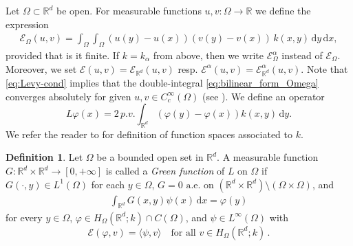 \documentclass[reqno]{amsart}
\theoremstyle{plain}
\theoremstyle{definition}
\newtheorem{definition}[theorem]{Definition}
\numberwithin{equation}{section}
\newcommand{\R}{\mathbb{R}}
\newcommand{\Rd}{\mathbb{R}^d}
\newcommand{\dx} {\, \mathrm{d}x}
\newcommand{\dy} {\, \mathrm{d}y}
\begin{document}
Let $\Omega \subset \Rd$ be open. For measurable functions $u, v: \Omega \to \R$ we define the expression
\begin{align} \label{eq:bilinear_form_Omega}
\mathcal{E}_\Omega (u, v) 
= \int_\Omega \int_\Omega (u(y) - u(x))(v(y) - v(x)) \, k(x,y) \dy \dx,
\end{align}
provided that is it finite. If $k=k_{\alpha}$ from above, then we write $\mathcal{E}_{\Omega}^{\alpha}$ instead of $\mathcal{E}_{\Omega}$. Moreover, we set $\mathcal{E}(u, v) = \mathcal{E}_{\Rd}(u, v)$ resp. $\mathcal{E}^{\alpha}(u, v) = \mathcal{E}_{\Rd}^{\alpha}(u, v)$. Note that \eqref{eq:Levy-cond} implies that the double-integral \eqref{eq:bilinear_form_Omega} converges absolutely for given $u, v \in C_c^\infty(\Omega)$ (see \cite[Example 1.2.1]{FOT11}). We define an operator
\begin{equation*}
L\varphi(x) = 2 \,p.v. \int_{\Rd} (\varphi(y)-\varphi(x)) k(x, y) \dy.
\end{equation*}
We refer the reader to  for definition of function spaces associated to $k$.

\begin{definition}\label{def:Green-function}
	Let $\Omega$ be a bounded open set in $\Rd$. A measurable function $G : \R^d \times \Rd \rightarrow [0, +\infty]$ is called a {\it Green function} of $L$ on $\Omega$ if $G(\cdot, y) \in L^{1}(\Omega)$ for each $y \in \Omega$, $G=0$ $\mathrm{a.e.}$ on $(\Rd \times \Rd) \setminus (\Omega \times \Omega)$, and
	\begin{align} \label{eq:Green_function}
	\int_{\Rd} G(x, y) \psi(x) \dx = \varphi(y)
	\end{align}
for every $y \in \Omega$, $\varphi \in H_{\Omega}(\Rd; k) \cap C(\Omega)$, and $\psi \in L^\infty(\Omega)$ with
\begin{equation} \label{eq:DP}
\mathcal{E}(\varphi, v) = \langle \psi, v \rangle \quad\text{for all } v \in H_{\Omega}(\Rd; k) \,.
\end{equation}
\end{definition}
\end{document}
